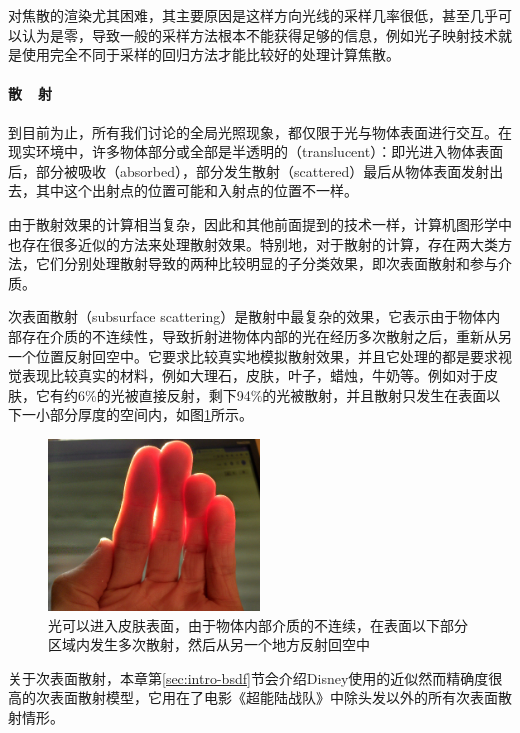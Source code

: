 对焦散的渲染尤其困难，其主要原因是这样方向光线的采样几率很低，甚至几乎可以认为是零，导致一般的采样方法根本不能获得足够的信息，例如光子映射技术就是使用完全不同于采样的回归方法才能比较好的处理计算焦散。



\paragraph{散~~射}
到目前为止，所有我们讨论的全局光照现象，都仅限于光与物体表面进行交互。在现实环境中，许多物体部分或全部是半透明的（translucent）：即光进入物体表面后，部分被吸收（absorbed），部分发生散射（scattered）最后从物体表面发射出去，其中这个出射点的位置可能和入射点的位置不一样。

由于散射效果的计算相当复杂，因此和其他前面提到的技术一样，计算机图形学中也存在很多近似的方法来处理散射效果。特别地，对于散射的计算，存在两大类方法，它们分别处理散射导致的两种比较明显的子分类效果，即次表面散射和参与介质。

次表面散射（subsurface scattering）是散射中最复杂的效果，它表示由于物体内部存在介质的不连续性，导致折射进物体内部的光在经历多次散射之后，重新从另一个位置反射回空中。它要求比较真实地模拟散射效果，并且它处理的都是要求视觉表现比较真实的材料，例如大理石，皮肤，叶子，蜡烛，牛奶等。例如对于皮肤，它有约6\%的光被直接反射，剩下94\%的光被散射，并且散射只发生在表面以下一小部分厚度的空间内，如图\ref{f:intro-sss}所示。

\begin{figure}
\sidecaption
\includegraphics[width=0.5\textwidth]{figures/intro/subsurface-scattering}	
\caption{光可以进入皮肤表面，由于物体内部介质的不连续，在表面以下部分区域内发生多次散射，然后从另一个地方反射回空中}
\label{f:intro-sss}
\end{figure}

关于次表面散射，本章第\ref{sec:intro-bsdf}节会介绍Disney使用的近似然而精确度很高的次表面散射模型，它用在了电影《超能陆战队》中除头发以外的所有次表面散射情形。

